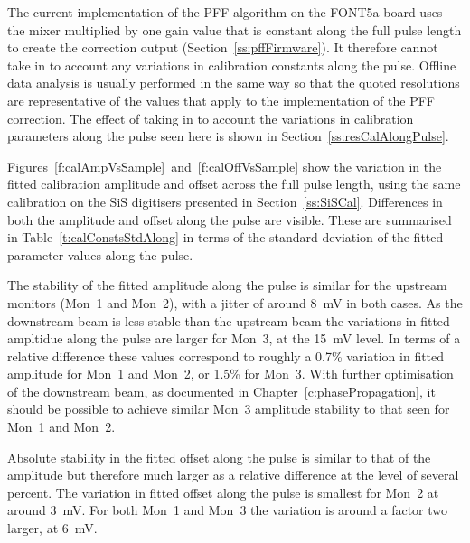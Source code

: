 The current implementation of the PFF algorithm on the FONT5a board uses the mixer multiplied by one gain value that is constant along the full pulse length to create the correction output (Section~\ref{ss:pffFirmware}). It therefore cannot take in to account any variations in calibration constants along the pulse. Offline data analysis is usually performed in the same way so that the quoted resolutions are representative of the values that apply to the implementation of the PFF correction. The effect of taking in to account the variations in calibration parameters along the pulse seen here is shown in Section~\ref{ss:resCalAlongPulse}.

Figures~\ref{f:calAmpVsSample}~and~\ref{f:calOffVsSample} show the variation in the fitted calibration amplitude and offset across the full pulse length, using the same calibration on the SiS digitisers presented in Section~\ref{ss:SiSCal}. Differences in both the amplitude and offset along the pulse are visible. These are summarised in Table~\ref{t:calConstsStdAlong} in terms of the standard deviation of the fitted parameter values along the pulse. 

The stability of the fitted amplitude along the pulse is similar for the upstream monitors (Mon~1 and Mon~2), with a jitter of around 8~mV in both cases. As the downstream beam is less stable than the upstream beam the variations in fitted ampltidue along the pulse are larger for Mon~3, at the 15~mV level. In terms of a relative difference these values correspond to roughly a 0.7\% variation in fitted amplitude for Mon~1 and Mon~2, or 1.5\% for Mon~3. With further optimisation of the downstream beam, as documented in Chapter~\ref{c:phasePropagation}, it should be possible to achieve similar Mon~3 amplitude stability to that seen for Mon~1 and Mon~2. 

Absolute stability in the fitted offset along the pulse is similar to that of the amplitude but therefore much larger as a relative difference at the level of several percent. The variation in fitted offset along the pulse is smallest for Mon~2 at around 3~mV. For both Mon~1 and Mon~3 the variation is around a factor two larger, at 6~mV.

